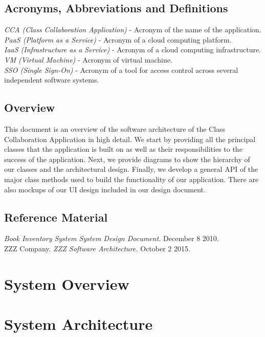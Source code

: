 \documentclass[16pt]{scrreprt}
\begin{document}
\section{Acronyms, Abbreviations and Definitions}
\textit{CCA (Class Collaboration Application)} - Acronym of the name of the application.  \\
\textit{PaaS (Platform as a Service)} - Acronym of a cloud computing platform. \\
\textit{IaaS (Infrastructure as a Service)} - Acronym of a cloud computing infrastructure.\\
\textit{VM (Virtual Machine)} - Acronym of virtual machine. \\
\textit{SSO (Single Sign-On)} - Acronym of a tool for access control across several independent software systems. 

\section{Overview}
This document is an overview of the software architecture of the Class Collaboration Application in high detail. We start by providing all the principal classes that the application is built on as well as their responsibilities to the success of the application. Next, we provide diagrams to show the hierarchy of our classes and the architectural design. Finally, we develop a general API of the major class methods used to build the functionality of our application. There are also mockups of our UI design included in our design document. 

\section{Reference Material}
\textit{Book Inventory System System Design Document.} December 8 2010. \\
ZZZ Company. \textit{ZZZ Software Architecture.} October 2 2015. 



\chapter{System Overview}


\chapter{System Architecture}
\end{document}
